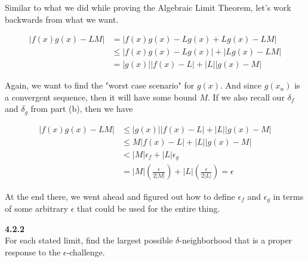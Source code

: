 \begin{enumerate}[(a)]
Similar to what we did while proving the Algebraic Limit Theorem, let's work backwards from what we want.

\begin{align*}
\left| f(x)g(x) - LM \right| &=  \left| f(x)g(x) - Lg(x) + Lg(x) - LM \right| \\
&\leq \left| f(x)g(x) - Lg(x) \right| + \left| Lg(x) - LM \right| \\
&= |g(x)| \left| f(x) - L \right| + |L|\left| g(x) - M \right|
\end{align*}

Again, we want to find the "worst case scenario" for $g(x)$.
And since $g(x_n)$ is a convergent sequence, then it will have some bound $M$.
If we also recall our $\delta_f$ and $\delta_g$ from part (b), then we have

\begin{align*}
\left| f(x)g(x) - LM \right| &\leq |g(x)| \left| f(x) - L \right| + |L|\left| g(x) - M \right| \\
&\leq M \left| f(x) - L \right| + |L|\left| g(x) - M \right| \\
&< |M| \epsilon_f + |L| \epsilon_g \\
&= |M| \left( \frac{\epsilon}{2|M|} \right) + |L|\left( \frac{\epsilon}{2|L|} \right) = \epsilon
\end{align*}

At the end there, we went ahead and figured out how to define $\epsilon_f$ and $\epsilon_g$ in terms of some arbitrary $\epsilon$
that could be used for the entire thing.

\end{enumerate}



\textbf{4.2.2}
\\

For each stated limit, find the largest possible $\delta$-neighborhood that is a proper response to the $\epsilon$-challenge.

